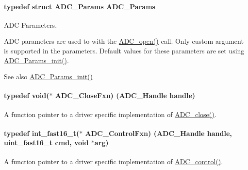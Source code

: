 \paragraph[{A\+D\+C\+\_\+\+Params}]{\setlength{\rightskip}{0pt plus 5cm}typedef struct {\bf A\+D\+C\+\_\+\+Params}  {\bf A\+D\+C\+\_\+\+Params}}\label{_a_d_c_8h_a1cd6c9decc95ce2f6acb5eeb3cc72eb2}


A\+D\+C Parameters. 

A\+D\+C parameters are used to with the \hyperlink{_a_d_c_8h_a9f3e5f311cda4df63e70660651b9314e}{A\+D\+C\+\_\+open()} call. Only custom argument is supported in the parameters. Default values for these parameters are set using \hyperlink{_a_d_c_8h_a21df1c0987f5cecb660581ae081c4dc7}{A\+D\+C\+\_\+\+Params\+\_\+init()}.

\begin{DoxySeeAlso}{See also}
\hyperlink{_a_d_c_8h_a21df1c0987f5cecb660581ae081c4dc7}{A\+D\+C\+\_\+\+Params\+\_\+init()} 
\end{DoxySeeAlso}
\paragraph[{A\+D\+C\+\_\+\+Close\+Fxn}]{\setlength{\rightskip}{0pt plus 5cm}typedef void($\ast$ A\+D\+C\+\_\+\+Close\+Fxn) ({\bf A\+D\+C\+\_\+\+Handle} handle)}\label{_a_d_c_8h_a42f6ff234d06fb71647510e04be8a3bf}


A function pointer to a driver specific implementation of \hyperlink{_a_d_c_8h_adb49f74bdef5e3e45ee5de306c5dfc08}{A\+D\+C\+\_\+close()}. 

\paragraph[{A\+D\+C\+\_\+\+Control\+Fxn}]{\setlength{\rightskip}{0pt plus 5cm}typedef int\+\_\+fast16\+\_\+t($\ast$ A\+D\+C\+\_\+\+Control\+Fxn) ({\bf A\+D\+C\+\_\+\+Handle} handle, uint\+\_\+fast16\+\_\+t cmd, void $\ast$arg)}\label{_a_d_c_8h_af9c178e22b377d9cf5eb7d2a1a072f12}


A function pointer to a driver specific implementation of \hyperlink{_a_d_c_8h_af4be7e5e4f5cc931f4501a542d689c32}{A\+D\+C\+\_\+control()}. 

